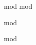 \documentclass[
  10pt,       %
  twoside,    %
  a4paper,    %
  english,    %
  tikz,       %
  openright,  %
]{book}
\begin{document}
\frontmatter
{mod}
{mod}

\cleardoublepage
\tableofcontents

\cleardoublepage
\mainmatter
{mod}

\backmatter
{mod}
\end{document}
